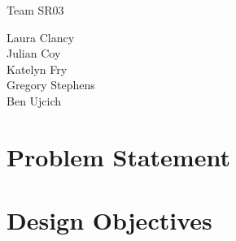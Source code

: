 \documentclass[11pt]{report}
\begin{document}
\begin{spacing}{1.5}

\thispagestyle{empty}

\vspace*{72pt}
{
\huge
\begin{center}
    \reporttitle
\end{center}
}
\vspace{72pt}

{
\huge
\begin{center}
  Team SR03
\end{center}
}

{
\Large 
\begin{center}
    Laura Clancy \\
    Julian Coy \\
    Katelyn Fry \\
    Gregory Stephens \\
    Ben Ujcich
\end{center}
}

\clearpage
\setcounter{page}{1}





\section*{Problem Statement} %


\section*{Design Objectives} %


\end{spacing}
\end{document}

